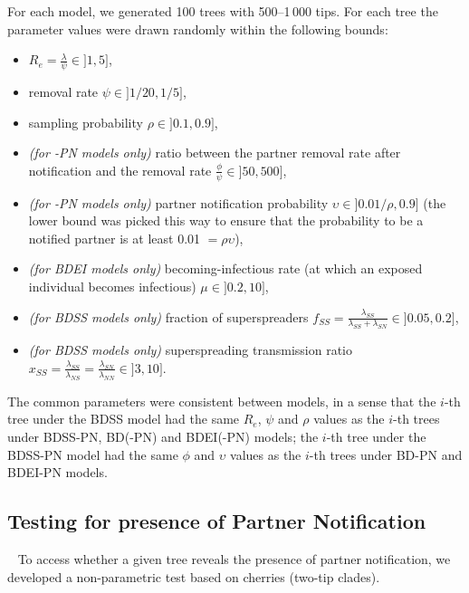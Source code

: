 \documentclass[10pt,letterpaper]{article}
\begin{document}
For each model, we generated 100 trees with 500--1\,000 tips. For each tree the parameter values were drawn randomly within the following bounds:
\begin{itemize}
\item $R_e = \frac{{\lambda}}{{\psi}} \in ]1, 5]$, 
\item removal rate $\psi \in ]1 / 20, 1 / 5]$,
\item sampling probability $\rho \in ]0.1, 0.9]$,
\item \textit{(for -PN models only)} ratio between the partner removal rate after notification and the removal rate $\frac{\phi}{\psi} \in ]50, 500]$,
\item \textit{(for -PN models only)} partner notification probability $\upsilon \in ]0.01/\rho, 0.9]$ (the lower bound was picked this way to ensure that the probability to be a notified partner is at least 0.01 $=\rho \upsilon$),
\item \textit{(for BDEI models only)} becoming-infectious rate (at which an exposed individual becomes infectious) $\mu \in ]0.2, 10]$,
\item \textit{(for BDSS models only)} fraction of superspreaders $f_{SS} = \frac{\lambda_{SS}}{\lambda_{SS} + \lambda_{SN}} \in ]0.05, 0.2]$,
\item \textit{(for BDSS models only)} superspreading transmission ratio $x_{SS} = \frac{\lambda_{SS}}{\lambda_{NS}} = \frac{\lambda_{SN}}{\lambda_{NN}} \in ]3, 10]$.
\end{itemize} 

The common parameters were consistent between models, in a sense that the $i$-th tree under the BDSS model had the same $R_e$, $\psi$ and $\rho$ values as the $i$-th trees under BDSS-PN, BD(-PN) and BDEI(-PN) models; the $i$-th tree under the BDSS-PN model had the same $\phi$ and $\upsilon$ values as the $i$-th trees under BD-PN and BDEI-PN models.



\subsection*{Testing for presence of Partner Notification}~\label{sec:test}
To access whether a given tree reveals the presence of partner notification, we developed a non-parametric test based on cherries (two-tip clades). 
\end{document}
